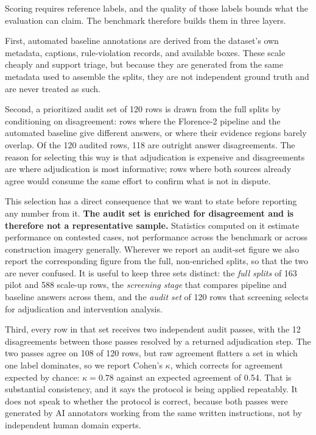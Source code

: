 \documentclass[conference]{IEEEtran}
\begin{document}
Scoring requires reference labels, and the quality of those labels bounds what the evaluation can claim. The benchmark therefore builds them in three layers.

First, automated baseline annotations are derived from the dataset's own metadata, captions, rule-violation records, and available boxes. These scale cheaply and support triage, but because they are generated from the same metadata used to assemble the splits, they are not independent ground truth and are never treated as such.

Second, a prioritized audit set of 120 rows is drawn from the full splits by conditioning on disagreement: rows where the Florence-2 pipeline and the automated baseline give different answers, or where their evidence regions barely overlap. Of the 120 audited rows, 118 are outright answer disagreements. The reason for selecting this way is that adjudication is expensive and disagreements are where adjudication is most informative; rows where both sources already agree would consume the same effort to confirm what is not in dispute.

This selection has a direct consequence that we want to state before reporting any number from it. \textbf{The audit set is enriched for disagreement and is therefore not a representative sample.} Statistics computed on it estimate performance on contested cases, not performance across the benchmark or across construction imagery generally. Wherever we report an audit-set figure we also report the corresponding figure from the full, non-enriched splits, so that the two are never confused. It is useful to keep three sets distinct: the \textit{full splits} of 163 pilot and 588 scale-up rows, the \textit{screening stage} that compares pipeline and baseline answers across them, and the \textit{audit set} of 120 rows that screening selects for adjudication and intervention analysis.

Third, every row in that set receives two independent audit passes, with the 12 disagreements between those passes resolved by a returned adjudication step. The two passes agree on 108 of 120 rows, but raw agreement flatters a set in which one label dominates, so we report Cohen's $\kappa$, which corrects for agreement expected by chance: $\kappa = 0.78$ against an expected agreement of 0.54. That is substantial consistency, and it says the protocol is being applied repeatably. It does not speak to whether the protocol is correct, because both passes were generated by AI annotators working from the same written instructions, not by independent human domain experts.
\end{document}
